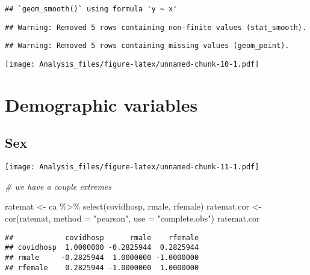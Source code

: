 \documentclass[
]{article}
\newenvironment{Shaded}{\begin{snugshade}}{\end{snugshade}}
\newcommand{\AttributeTok}[1]{\textcolor[rgb]{0.77,0.63,0.00}{#1}}
\newcommand{\CommentTok}[1]{\textcolor[rgb]{0.56,0.35,0.01}{\textit{#1}}}
\newcommand{\FunctionTok}[1]{\textcolor[rgb]{0.00,0.00,0.00}{#1}}
\newcommand{\NormalTok}[1]{#1}
\newcommand{\OtherTok}[1]{\textcolor[rgb]{0.56,0.35,0.01}{#1}}
\newcommand{\SpecialCharTok}[1]{\textcolor[rgb]{0.00,0.00,0.00}{#1}}
\newcommand{\StringTok}[1]{\textcolor[rgb]{0.31,0.60,0.02}{#1}}
\begin{document}
\begin{verbatim}
## `geom_smooth()` using formula 'y ~ x'
\end{verbatim}

\begin{verbatim}
## Warning: Removed 5 rows containing non-finite values (stat_smooth).
\end{verbatim}

\begin{verbatim}
## Warning: Removed 5 rows containing missing values (geom_point).
\end{verbatim}

\texttt{[image: Analysis\_files/figure-latex/unnamed-chunk-10-1.pdf]}

\hypertarget{demographic-variables-1}{%
\section{Demographic variables}\label{demographic-variables-1}}

\hypertarget{sex}{%
\subsection{Sex}\label{sex}}

\begin{Shaded}
\end{Shaded}

\texttt{[image: Analysis\_files/figure-latex/unnamed-chunk-11-1.pdf]}

\begin{Shaded}
\begin{Highlighting}[]
\CommentTok{\# we have a couple extremes}

\NormalTok{ratemat }\OtherTok{\textless{}{-}}\NormalTok{ ca }\SpecialCharTok{\%\textgreater{}\%} \FunctionTok{select}\NormalTok{(covidhosp, rmale, rfemale) }
\NormalTok{ratemat.cor }\OtherTok{\textless{}{-}} \FunctionTok{cor}\NormalTok{(ratemat,  }\AttributeTok{method =} \StringTok{"pearson"}\NormalTok{, }\AttributeTok{use =} \StringTok{"complete.obs"}\NormalTok{)}
\NormalTok{ratemat.cor}
\end{Highlighting}
\end{Shaded}

\begin{verbatim}
##            covidhosp      rmale    rfemale
## covidhosp  1.0000000 -0.2825944  0.2825944
## rmale     -0.2825944  1.0000000 -1.0000000
## rfemale    0.2825944 -1.0000000  1.0000000
\end{verbatim}
\end{document}
